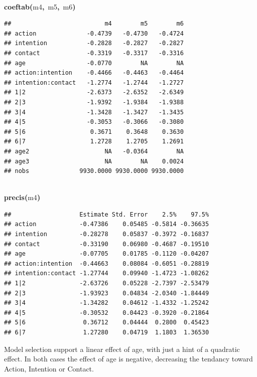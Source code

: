 \documentclass{article}
\makeatletter
\newcommand{\hlfunctioncall}[1]{\textcolor[rgb]{.5,0,.33}{\textbf{#1}}}%
\newcommand{\hlkeyword}[1]{\textbf{#1}}%
\newcommand{\hlsymbol}[1]{#1}%
\newcommand{\hlstd}[1]{\textcolor[rgb]{0,0,0}{#1}}%
\newenvironment{kframe}{%
 \def\FrameCommand##1{\hskip\@totalleftmargin \hskip-\fboxsep
 \colorbox{shadecolor}{##1}\hskip-\fboxsep
     \hskip-\linewidth \hskip-\@totalleftmargin \hskip\columnwidth}%
 \MakeFramed {\advance\hsize-\width
   \@totalleftmargin\z@ \linewidth\hsize
   \@setminipage}}%
 {\par\unskip\endMakeFramed}
\newenvironment{knitrout}{}{} %
\makeatother
\begin{document}
\begin{knitrout}
{\begin{kframe}
\begin{flushleft}
\ttfamily\noindent
\hspace*{\fill}\\
\hlstd{}\hlfunctioncall{coeftab}\hlkeyword{(}\hlsymbol{m4}\hlkeyword{,}{\ }\hlsymbol{m5}\hlkeyword{,}{\ }\hlsymbol{m6}\hlkeyword{)}\mbox{}
\normalfont
\end{flushleft}
\begin{verbatim}
##                          m4        m5        m6
## action              -0.4739   -0.4730   -0.4724
## intention           -0.2828   -0.2827   -0.2827
## contact             -0.3319   -0.3317   -0.3316
## age                 -0.0770        NA        NA
## action:intention    -0.4466   -0.4463   -0.4464
## intention:contact   -1.2774   -1.2744   -1.2727
## 1|2                 -2.6373   -2.6352   -2.6349
## 2|3                 -1.9392   -1.9384   -1.9388
## 3|4                 -1.3428   -1.3427   -1.3435
## 4|5                 -0.3053   -0.3066   -0.3080
## 5|6                  0.3671    0.3648    0.3630
## 6|7                  1.2728    1.2705    1.2691
## age2                     NA   -0.0364        NA
## age3                     NA        NA    0.0024
## nobs              9930.0000 9930.0000 9930.0000
\end{verbatim}
\begin{flushleft}
\ttfamily\noindent
\hspace*{\fill}\\
\hlstd{}\hlfunctioncall{precis}\hlkeyword{(}\hlsymbol{m4}\hlkeyword{)}\mbox{}
\normalfont
\end{flushleft}
\begin{verbatim}
##                   Estimate Std. Error    2.5%    97.5%
## action            -0.47386    0.05485 -0.5814 -0.36635
## intention         -0.28278    0.05837 -0.3972 -0.16837
## contact           -0.33190    0.06980 -0.4687 -0.19510
## age               -0.07705    0.01785 -0.1120 -0.04207
## action:intention  -0.44663    0.08084 -0.6051 -0.28819
## intention:contact -1.27744    0.09940 -1.4723 -1.08262
## 1|2               -2.63726    0.05228 -2.7397 -2.53479
## 2|3               -1.93923    0.04834 -2.0340 -1.84449
## 3|4               -1.34282    0.04612 -1.4332 -1.25242
## 4|5               -0.30532    0.04423 -0.3920 -0.21864
## 5|6                0.36712    0.04444  0.2800  0.45423
## 6|7                1.27280    0.04719  1.1803  1.36530
\end{verbatim}
\end{kframe}}
\end{knitrout}


Model selection support a linear effect of age, with just a hint of a quadratic effect. 
In both cases the effect of age is negative, decreasing the tendancy toward Action, Intention or Contact. 
\end{document}
